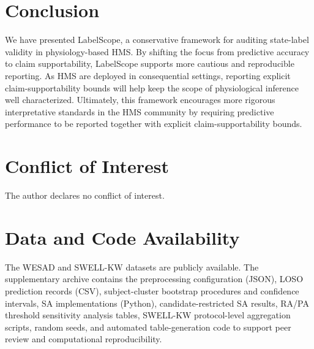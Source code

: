 \documentclass[journal]{IEEEtran}
\begin{document}
\section{Conclusion}
We have presented LabelScope, a conservative framework for auditing state-label validity in physiology-based HMS. By shifting the focus from predictive accuracy to claim supportability, LabelScope supports more cautious and reproducible reporting. As HMS are deployed in consequential settings, reporting explicit claim-supportability bounds will help keep the scope of physiological inference well characterized. Ultimately, this framework encourages more rigorous interpretative standards in the HMS community by requiring predictive performance to be reported together with explicit claim-supportability bounds.

\section*{Conflict of Interest}
The author declares no conflict of interest.

\section*{Data and Code Availability}
The WESAD and SWELL-KW datasets are publicly available. The supplementary archive contains the preprocessing configuration (JSON), LOSO prediction records (CSV), subject-cluster bootstrap procedures and confidence intervals, SA implementations (Python), candidate-restricted SA results, RA/PA threshold sensitivity analysis tables, SWELL-KW protocol-level aggregation scripts, random seeds, and automated table-generation code to support peer review and computational reproducibility.
\end{document}
